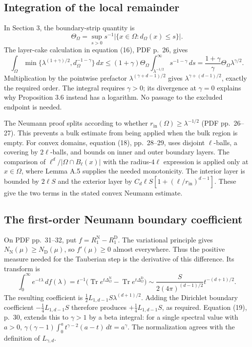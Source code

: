 \documentclass[10pt]{article}
\begin{document}
\subsection*{Integration of the local remainder}
In Section 3, the boundary-strip quantity is \[\Theta_\Omega=\sup_{s>0}s^{-1}
 |\{x\in\Omega:d_\Omega(x)\le s\}|.\] The layer-cake calculation in equation (16), PDF p. 26, gives \[\int_\Omega\min\{\lambda^{(1+\gamma)/2},d_\Omega^{-1-\gamma}\}\,dx
 \le (1+\gamma)\Theta_\Omega
 \int_{\lambda^{-1/2}}^\infty s^{-1-\gamma}\,ds
 =\frac{1+\gamma}{\gamma}\Theta_\Omega\lambda^{\gamma/2}.\] Multiplication by the pointwise prefactor \(\lambda^{(\gamma+d-1)/2}\) gives \(\lambda^{\gamma+(d-1)/2}\), exactly the required order. The integral requires \(\gamma>0\); its divergence at \(\gamma=0\) explains why Proposition 3.6 instead has a logarithm. No passage to the excluded endpoint is needed.\par
The Neumann proof splits according to whether \(r_{\mathrm{in}}(\Omega)\ge\lambda^{-1/2}\) (PDF pp. 26–27). This prevents a bulk estimate from being applied when the bulk region is empty. For convex domains, equation (18), pp. 28–29, uses disjoint \(\ell\)-balls, a covering by \(2\ell\)-balls, and bounds on inner and outer boundary layers. The comparison of \(\ell^d/|\Omega\cap B_\ell(x)|\) with the radius-\(4\ell\) expression is applied only at \(x\in\Omega\), where Lemma A.5 supplies the needed monotonicity. The interior layer is bounded by \(2\ell S\) and the exterior layer by \(C_d\ell S[1+(\ell/r_{\mathrm{in}})^{d-1}]\). These give the two terms in the stated convex Neumann estimate.\par
\subsection*{The first-order Neumann boundary coefficient}
On PDF pp. 31–32, put \(f=R_1^{\mathrm N}-R_1^{\mathrm D}\). The variational principle gives \(N_{\mathrm N}(\mu)\ge
N_{\mathrm D}(\mu)\), so \(f'(\mu)\ge0\) almost everywhere. Thus the positive measure needed for the Tauberian step is the derivative of this difference. Its transform is \[\int_0^\infty e^{-t\lambda}\,df(\lambda)
 =t^{-1}\bigl(\operatorname{Tr}e^{t\Delta_\Omega^{\mathrm N}}
              -\operatorname{Tr}e^{t\Delta_\Omega^{\mathrm D}}\bigr)
 \sim \frac{S}{2(4\pi)^{(d-1)/2}}t^{-(d+1)/2}.\] The resulting coefficient is \(\tfrac12 L_{1,d-1}S\lambda^{(d+1)/2}\). Adding the Dirichlet boundary coefficient \(-\tfrac14L_{1,d-1}S\) therefore produces \(+\tfrac14L_{1,d-1}S\), as required. Equation (19), p. 30, extends this to \(\gamma>1\) by a beta integral: for a single spectral value with \(a>0\), \(\gamma(\gamma-1)\int_0^a t^{\gamma-2}(a-t)\,dt=a^\gamma\). The normalization agrees with the definition of \(L_{\gamma,d}\).\par
\end{document}
